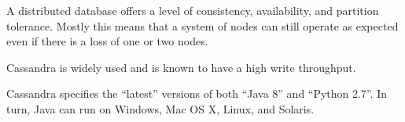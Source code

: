 A distributed database offers a level of consistency, availability, and partition tolerance.  Mostly this means that a system of nodes can still operate as expected even if there is a loss of one or two nodes.

Cassandra is widely used and is known to have a high write throughput.




Cassandra specifies the “latest” versions of both “Java 8” and “Python 2.7”.  In turn, Java can run on Windows, Mac OS X, Linux, and Solaris.

\begin{table}
\begin{tabular}{ | p{3cm} | l | l | l | p{4cm} | }
  \hline


\end{tabular}
\end{table}
